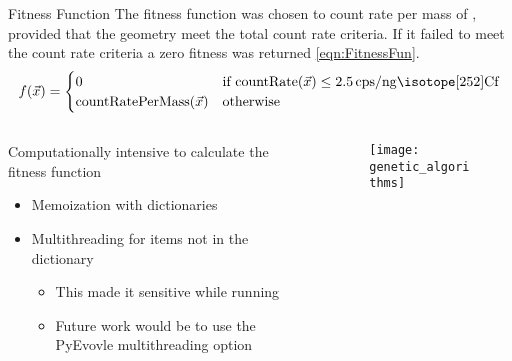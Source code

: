 \begin{frame}{Fitness Function}
The fitness function was chosen to count rate per mass of , provided that the geometry meet the total count rate criteria.
If it failed to meet the count rate criteria a zero fitness was returned \eqref{eqn:FitnessFun}.
	\tiny
	\begin{align}
			\label{eqn:FitnessFun}
			f(\vec{x})
			= \begin{cases}
			0 & \text{if}~\text{countRate}(\vec{x}) \leq \SI{2.5}{cps\per\nano\gram\iso[252]{Cf}} \\
			\text{countRatePerMass}(\vec{x}) & \text{otherwise}
			\end{cases}
	\end{align}
\begin{columns}[onlytextwidth]
  \begin{column}{0.5\textwidth}
\small
	Computationally intensive to calculate the fitness function 
	\begin{itemize}
		\item Memoization with dictionaries
		\item Multithreading for items not in the dictionary
		\tiny
		\begin{itemize}
			\item This made it sensitive while running
			\item Future work would be to use the PyEvovle multithreading option
		\end{itemize}
	\end{itemize}
	\end{column}
	\begin{column}{0.4\textwidth}
    \begin{figure}
      \centering
      \texttt{[image: genetic\_algorithms]}
    \end{figure}
	\end{column}
\end{columns}
\hyperlink{GAMethod}{}
\hyperlink{toc}{}
\end{frame}
